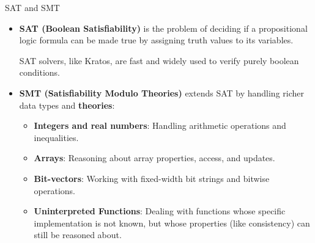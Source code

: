 \documentclass[aspectratio=1610,10.5pt]{beamer} %
\begin{document}
\begin{frame}{SAT and SMT}
    \begin{itemize}
        \item \textbf{SAT (Boolean Satisfiability)} is the problem of deciding if a propositional logic formula can be made true by assigning truth values to its variables.

            \smallskip

            SAT solvers, like Kratos, are fast and widely used to verify purely boolean conditions.
        \item \textbf{SMT (Satisfiability Modulo Theories)} extends SAT by handling richer data types and \textbf{theories}:
            \begin{itemize}
                \item \textbf{Integers and real numbers}: Handling arithmetic operations and inequalities.
                \item \textbf{Arrays}: Reasoning about array properties, access, and updates.
                \item \textbf{Bit-vectors}: Working with fixed-width bit strings and bitwise operations.
                \item \textbf{Uninterpreted Functions}: Dealing with functions whose specific implementation is not known, but whose properties (like consistency) can still be reasoned about.
            \end{itemize}
    \end{itemize}
\end{frame}
\end{document}
